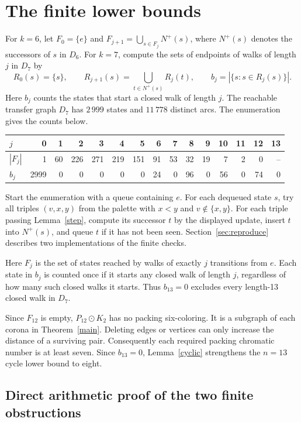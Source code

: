 \documentclass[11pt]{article}
\begin{document}
\section{The finite lower bounds}
\label{sec:lower}
For \(k=6\), let \(F_0=\{e\}\) and
\(F_{j+1}=\bigcup_{s\in F_j}N^+(s)\), where \(N^+(s)\) denotes
the successors of \(s\) in \(D_6\). For \(k=7\), compute the
sets of endpoints of walks of length \(j\) in \(D_7\) by
\[
  R_0(s)=\{s\},\qquad
  R_{j+1}(s)=\bigcup_{t\in N^+(s)} R_j(t),\qquad
  b_j=|\{s:s\in R_j(s)\}|.
\]
Here \(b_j\) counts the states that start a closed walk of length \(j\).
The reachable transfer graph \(D_7\) has \(2\,999\) states and
\(11\,778\) distinct arcs. The enumeration gives the counts below.
\begin{center}
\small\setlength{\tabcolsep}{3pt}
\begin{tabular}{@{}lrrrrrrrrrrrrrr@{}}
\toprule
\(j\)&0&1&2&3&4&5&6&7&8&9&10&11&12&13\\
\midrule
\(|F_j|\)&1&60&226&271&219&151&91&53&32&19&7&2&0&--\\
\(b_j\)&2999&0&0&0&0&0&24&0&96&0&56&0&74&0\\
\bottomrule
\end{tabular}
\end{center}

Start the enumeration with a queue containing \(e\).
For each dequeued state \(s\), try all triples \((v,x,y)\) from the
palette with \(x<y\) and \(v\notin\{x,y\}\). For each triple passing
Lemma~\ref{step}, compute its successor \(t\) by the displayed update,
insert \(t\) into \(N^+(s)\), and queue \(t\) if it has not been seen.
Section~\ref{sec:reproduce} describes two implementations of the finite
checks.

Here \(F_j\) is the set of states reached by walks of exactly \(j\)
transitions from \(e\). Each state in \(b_j\) is counted once if it starts
any closed walk of length \(j\), regardless of how many such closed
walks it starts. Thus \(b_{13}=0\) excludes every length-13 closed walk
in \(D_7\).

Since \(F_{12}\) is empty, \(P_{12}\odot K_2\) has no packing six-coloring.
It is a subgraph of each corona in Theorem~\ref{main}. Deleting edges or
vertices can only increase the distance of a surviving pair. Consequently
each required packing chromatic number is at least seven. Since \(b_{13}=0\),
Lemma~\ref{cyclic} strengthens the \(n=13\) cycle lower bound to eight.

\subsection{Direct arithmetic proof of the two finite obstructions}
\end{document}
